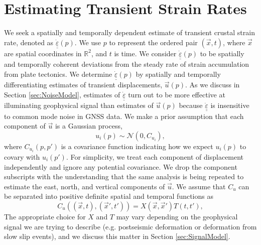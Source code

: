 \documentclass[10pt,letter]{article}
\newcommand*{\du}[1]{\underline{\underline{#1}}}
\begin{document}
\section{Estimating Transient Strain Rates}\label{sec:Method}
We seek a spatially and temporally dependent estimate of transient crustal strain rate, denoted as $\dot{\du{\varepsilon}}(p)$. We use $p$ to represent the ordered pair $(\vec{x},t)$, where $\vec{x}$ are spatial coordinates in $\mathbb{R}^2$, and $t$ is time. We consider $\dot{\du{\varepsilon}}(p)$ to be spatially and temporally coherent deviations from the steady rate of strain accumulation from plate tectonics. We determine $\dot{\du{\varepsilon}}(p)$ by spatially and temporally differentiating estimates of transient displacements, $\vec{u}(p)$.  As we discuss in Section \ref{sec:NoiseModel}, estimates of $\dot{\du{\varepsilon}}$ turn out to be more effective at illuminating geophysical signal than estimates of $\vec{u}(p)$ because $\dot{\du{\varepsilon}}$ is insensitive to common mode noise in GNSS data.  We make a prior assumption that each component of $\vec{u}$ is a Gaussian process,
\begin{equation}\label{eq:TransientDeformation}
u_i(p) \sim \mathcal{N}\left(0,C_{u_i}\right),
\end{equation}
where $C_{u_i}(p,p')$ is a covariance function indicating how we expect $u_i(p)$ to covary with $u_i(p')$. For simplicity, we treat each component of displacement independently and ignore any potential covariance. We drop the component subscripts with the understanding that the same analysis is being repeated to estimate the east, north, and vertical components of $\vec{u}$. We assume that $C_u$ can be separated into positive definite spatial and temporal functions as 
\begin{equation}\label{eq:TransientCovariance}
C_{u}\left((\vec{x},t),(\vec{x}',t')\right) = X(\vec{x},\vec{x}')T(t,t'),
\end{equation}  
The appropriate choice for $X$ and $T$ may vary depending on the geophysical signal we are trying to describe (e.g. postseismic deformation or deformation from slow slip events), and we discuss this matter in Section \ref{sec:SignalModel}.  
\end{document}
